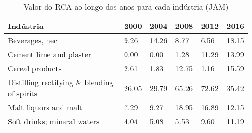 \begin{table}
\centering
\caption{Valor do RCA ao longo dos anos para cada indústria (JAM)}
\begin{tabular}{p{6cm}p{1.5cm}p{1.5cm}p{1.5cm}p{1.5cm}p{1.5cm}}
\toprule
                                  Indústria &  2000 &  2004 &  2008 &  2012 &  2016 \\
\midrule
                             Beverages, nec &  9.26 & 14.26 &  8.77 &  6.56 & 18.15 \\
                    Cement lime and plaster &  0.00 &  0.00 &  1.28 & 11.29 & 13.99 \\
                            Cereal products &  2.61 &  1.83 & 12.75 &  1.16 & 15.59 \\
Distilling rectifying \& blending of spirits & 26.05 & 29.79 & 65.26 & 72.62 & 35.42 \\
                      Malt liquors and malt &  7.29 &  9.27 & 18.95 & 16.89 & 12.15 \\
                Soft drinks; mineral waters &  4.04 &  5.08 &  5.53 &  9.60 & 11.19 \\
\bottomrule
\end{tabular}
\end{table}
